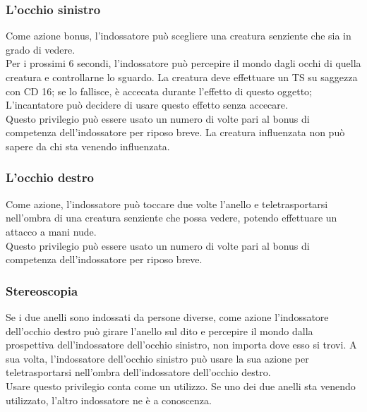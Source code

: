 \subsubsection{L'occhio sinistro}
Come azione bonus, l'indossatore può scegliere una creatura senziente che sia in grado di vedere. \\ Per i prossimi 6 secondi, l'indossatore può percepire il mondo dagli occhi di quella creatura e controllarne lo sguardo. La creatura deve effettuare un TS su saggezza con CD 16; se lo fallisce, è accecata durante l'effetto di questo oggetto; L'incantatore può decidere di usare questo effetto senza accecare. \\ Questo privilegio può essere usato un numero di volte pari al bonus di competenza dell'indossatore per riposo breve. La creatura influenzata non può sapere da chi sta venendo influenzata.

\subsubsection{L'occhio destro}
Come azione, l'indossatore può toccare due volte l'anello e teletrasportarsi nell'ombra di una creatura senziente che possa vedere, potendo effettuare un attacco a mani nude. \\ Questo privilegio può essere usato un numero di volte pari al bonus di competenza dell'indossatore per riposo breve.

\subsubsection{Stereoscopia}
Se i due anelli sono indossati da persone diverse, come azione l'indossatore dell'occhio destro può girare l'anello sul dito e percepire il mondo dalla prospettiva dell'indossatore dell'occhio sinistro, non importa dove esso si trovi. A sua volta, l'indossatore dell'occhio sinistro può usare la sua azione per teletrasportarsi nell'ombra dell'indossatore dell'occhio destro. \\ Usare questo privilegio conta come un utilizzo. Se uno dei due anelli sta venendo utilizzato, l'altro indossatore ne è a conoscenza.
